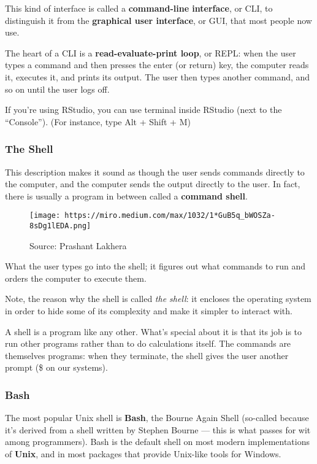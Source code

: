 \documentclass[
]{book}
\begin{document}
This kind of interface is called a \textbf{command-line interface}, or CLI,
to distinguish it from the \textbf{graphical user interface}, or GUI, that most people now use.

The heart of a CLI is a \textbf{read-evaluate-print loop}, or REPL: when the user types a command and then presses the enter (or return) key, the computer reads it, executes it, and prints its output. The user then types another command, and so on until the user logs off.

If you're using RStudio, you can use terminal inside RStudio (next to the ``Console''). (For instance, type Alt + Shift + M)

\hypertarget{the-shell}{%
\subsubsection{The Shell}\label{the-shell}}

This description makes it sound as though the user sends commands directly to the computer, and the computer sends the output directly to the user. In fact, there is usually a program in between called a \textbf{command shell}.

\begin{figure}
\centering
\texttt{[image: https://miro.medium.com/max/1032/1*GuB5q\_bWOSZa-8sDg1lEDA.png]}
\caption{Source: Prashant Lakhera}
\end{figure}

What the user types go into the shell; it figures out what commands to run and orders the computer to execute them.

Note, the reason why the shell is called \emph{the shell}: it encloses the operating system in order to hide some of its complexity and make it simpler to interact with.

A shell is a program like any other. What's special about it is that its job is to run other programs rather than to do calculations itself. The commands are themselves programs: when they terminate, the shell gives the user another prompt (\$ on our systems).

\hypertarget{bash}{%
\subsubsection{Bash}\label{bash}}

The most popular Unix shell is \textbf{Bash}, the Bourne Again Shell (so-called because it's derived from a shell written by Stephen Bourne --- this is what passes for wit among programmers). Bash is the default shell on most modern implementations of \textbf{Unix}, and in most packages that provide Unix-like tools for Windows.
\end{document}
